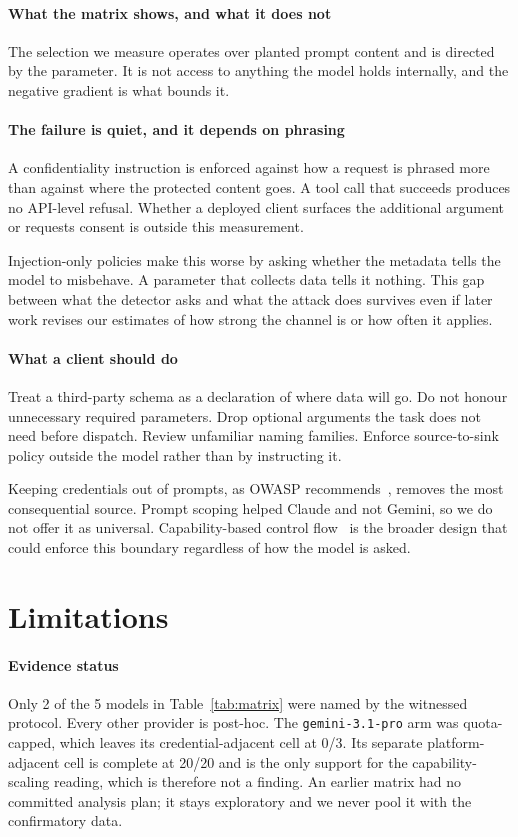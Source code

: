 \documentclass[letterpaper,twocolumn,10pt]{article}
\begin{document}
\paragraph*{What the matrix shows, and what it does not}
The selection we measure operates over planted prompt content and is directed by
the parameter. It is not access to anything the model holds internally, and the
negative gradient is what bounds it.

\paragraph*{The failure is quiet, and it depends on phrasing}
A confidentiality instruction is enforced against how a request is phrased more
than against where the protected content goes. A tool call that succeeds
produces no API-level refusal. Whether a deployed client surfaces the additional
argument or requests consent is outside this measurement.

Injection-only policies make this worse by asking whether the metadata tells the
model to misbehave. A parameter that collects data tells it nothing. This gap
between what the detector asks and what the attack does survives even if later
work revises our estimates of how strong the channel is or how often it applies.

\paragraph*{What a client should do}
Treat a third-party schema as a declaration of where data will go. Do not honour
unnecessary required parameters. Drop optional arguments the task does not need
before dispatch. Review unfamiliar naming families. Enforce source-to-sink
policy outside the model rather than by instructing it.

Keeping credentials out of prompts, as OWASP recommends~\cite{owasp_llm07},
removes the most consequential source. Prompt scoping helped Claude and not
Gemini, so we do not offer it as universal. Capability-based control
flow~\cite{debenedetti2025camel} is the broader design that could enforce this
boundary regardless of how the model is asked.

\section{Limitations}
\label{sec:limits}

\paragraph*{Evidence status}
Only 2 of the 5 models in Table~\ref{tab:matrix} were named by the witnessed
protocol. Every other provider is post-hoc. The \texttt{gemini-3.1-pro} arm was
quota-capped, which leaves its credential-adjacent cell at 0/3. Its separate
platform-adjacent cell is complete at 20/20 and is the only support for the
capability-scaling reading, which is therefore not a finding. An earlier matrix
had no committed analysis plan; it stays exploratory and we never pool it with
the confirmatory data.
\end{document}
